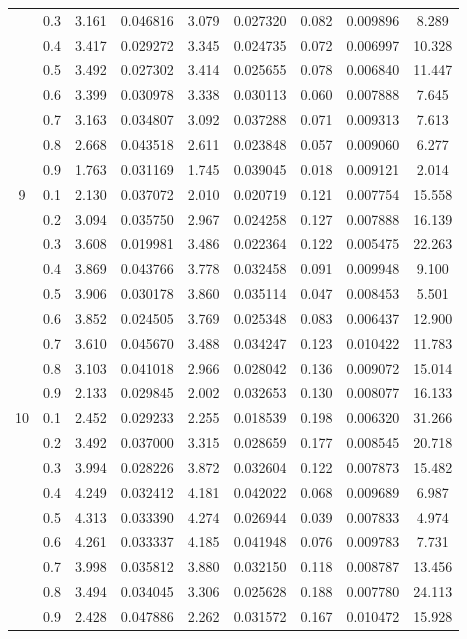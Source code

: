 \begin{longtable}{ | c | c || c | c | c | c | c | c | c | }
 & 0.3 & 3.161 & 0.046816 & 3.079 & 0.027320 & 0.082 & 0.009896 & 8.289 \\
 & 0.4 & 3.417 & 0.029272 & 3.345 & 0.024735 & 0.072 & 0.006997 & 10.328 \\
 & 0.5 & 3.492 & 0.027302 & 3.414 & 0.025655 & 0.078 & 0.006840 & 11.447 \\
 & 0.6 & 3.399 & 0.030978 & 3.338 & 0.030113 & 0.060 & 0.007888 & 7.645 \\
 & 0.7 & 3.163 & 0.034807 & 3.092 & 0.037288 & 0.071 & 0.009313 & 7.613 \\
 & 0.8 & 2.668 & 0.043518 & 2.611 & 0.023848 & 0.057 & 0.009060 & 6.277 \\
 & 0.9 & 1.763 & 0.031169 & 1.745 & 0.039045 & 0.018 & 0.009121 & 2.014 \\
 \hline
\multirow{9}{*}{9} & 0.1 & 2.130 & 0.037072 & 2.010 & 0.020719 & 0.121 & 0.007754 & 15.558 \\
 & 0.2 & 3.094 & 0.035750 & 2.967 & 0.024258 & 0.127 & 0.007888 & 16.139 \\
 & 0.3 & 3.608 & 0.019981 & 3.486 & 0.022364 & 0.122 & 0.005475 & 22.263 \\
 & 0.4 & 3.869 & 0.043766 & 3.778 & 0.032458 & 0.091 & 0.009948 & 9.100 \\
 & 0.5 & 3.906 & 0.030178 & 3.860 & 0.035114 & 0.047 & 0.008453 & 5.501 \\
 & 0.6 & 3.852 & 0.024505 & 3.769 & 0.025348 & 0.083 & 0.006437 & 12.900 \\
 & 0.7 & 3.610 & 0.045670 & 3.488 & 0.034247 & 0.123 & 0.010422 & 11.783 \\
 & 0.8 & 3.103 & 0.041018 & 2.966 & 0.028042 & 0.136 & 0.009072 & 15.014 \\
 & 0.9 & 2.133 & 0.029845 & 2.002 & 0.032653 & 0.130 & 0.008077 & 16.133 \\
 \hline
\multirow{9}{*}{10} & 0.1 & 2.452 & 0.029233 & 2.255 & 0.018539 & 0.198 & 0.006320 & 31.266 \\
 & 0.2 & 3.492 & 0.037000 & 3.315 & 0.028659 & 0.177 & 0.008545 & 20.718 \\
 & 0.3 & 3.994 & 0.028226 & 3.872 & 0.032604 & 0.122 & 0.007873 & 15.482 \\
 & 0.4 & 4.249 & 0.032412 & 4.181 & 0.042022 & 0.068 & 0.009689 & 6.987 \\
 & 0.5 & 4.313 & 0.033390 & 4.274 & 0.026944 & 0.039 & 0.007833 & 4.974 \\
 & 0.6 & 4.261 & 0.033337 & 4.185 & 0.041948 & 0.076 & 0.009783 & 7.731 \\
 & 0.7 & 3.998 & 0.035812 & 3.880 & 0.032150 & 0.118 & 0.008787 & 13.456 \\
 & 0.8 & 3.494 & 0.034045 & 3.306 & 0.025628 & 0.188 & 0.007780 & 24.113 \\
 & 0.9 & 2.428 & 0.047886 & 2.262 & 0.031572 & 0.167 & 0.010472 & 15.928 \\
 \hline
\hline
\end{longtable}
 
